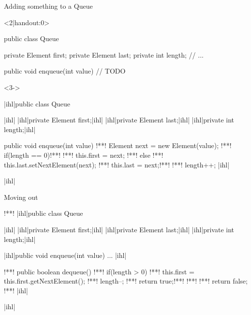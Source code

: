 \begin{frame}[c,fragile]{Adding something to a Queue}
\SetupLstHl
\begin{onlyenv}<2|handout:0>
\begin{plainjava}
public class Queue {
    private Element first;
    private Element last;
    private int length;
    // ...

    public void enqueue(int value) {
        // TODO
    }
}
\end{plainjava}
\end{onlyenv}
\begin{onlyenv}<3->
    \begin{plainjava}
|ihl|public class Queue {|ihl|
    |ihl|private Element first;|ihl|
    |ihl|private Element last;|ihl|
    |ihl|private int length;|ihl|

    public void enqueue(int value) {
!**!        Element next = new Element(value);
!**!        if(length == 0)!**!
!**!            this.first = next;
!**!        else
!**!            this.last.setNextElement(next);
!**!        this.last = next;!**!
!**!        length++;
    }
|ihl|}|ihl|
\end{plainjava}
\end{onlyenv}
\end{frame}

\begin{frame}[c,fragile]{Moving out}
\SetupLstHl
\begin{plainjava}
!**!
|ihl|public class Queue {|ihl|
    |ihl|private Element first;|ihl|
    |ihl|private Element last;|ihl|
    |ihl|private int length;|ihl|

    |ihl|public void enqueue(int value) { ... }|ihl|

!**!    public boolean dequeue() {
!**!        if(length > 0) {
!**!            this.first = this.first.getNextElement();
!**!            length--;
!**!            return true;!**!
!**!        }
!**!        return false;
!**!    }
|ihl|}|ihl|
\end{plainjava}
\end{frame}

